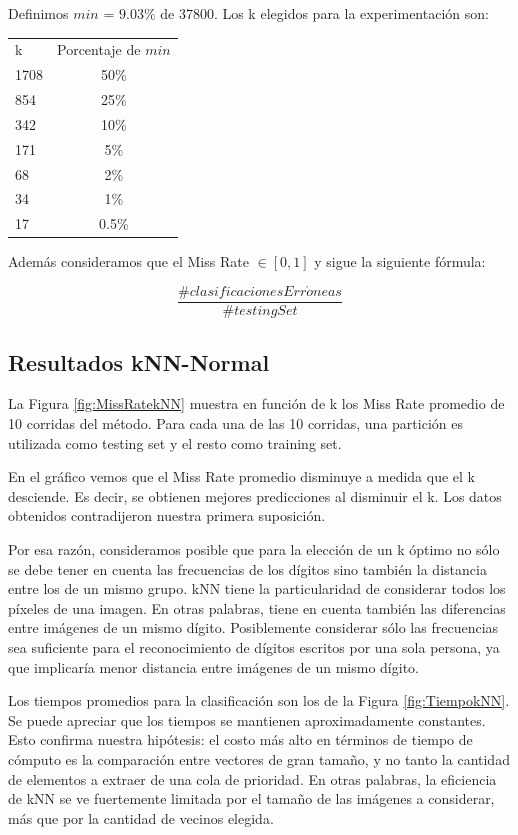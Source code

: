 \documentclass{article}
\begin{document}
Definimos $min$ = $9.03\%$ de 37800. Los k elegidos para la experimentación son: \newline

\begin{center}
\begin{tabular}{ l | c }
 k & Porcentaje de $min$  \\
1708 & 50\% \\
854 & 25\% \\
342 & 10\% \\
171 & 5\% \\
68 & 2\% \\
34 & 1\% \\
17& 0.5\% \\

\end{tabular}
\end{center}

Además consideramos que el Miss Rate $\in [0,1]$ y sigue la siguiente fórmula:

$$\frac{\#clasificacionesErr\acute{o}neas}{\#testingSet}$$

\subsection*{Resultados kNN-Normal}

La Figura \ref{fig:MissRatekNN} muestra en función de k los Miss Rate promedio de 10 corridas del método. Para cada una de las 10 corridas, una partición es utilizada como testing set y el resto como training set.

En el gráfico vemos que el Miss Rate promedio disminuye a medida que el k desciende. Es decir, se obtienen mejores predicciones al disminuir el k. Los datos obtenidos contradijeron nuestra primera suposición.

Por esa razón, consideramos posible que para la elección de un k óptimo no sólo se debe tener en cuenta las frecuencias de los dígitos sino también la distancia entre los de un mismo grupo. kNN tiene la particularidad de considerar todos los píxeles de una imagen. En otras palabras, tiene en cuenta también las diferencias entre imágenes de un mismo dígito. Posiblemente considerar sólo las frecuencias sea suficiente para el reconocimiento de dígitos escritos por una sola persona, ya que implicaría menor distancia entre imágenes de un mismo dígito.

Los tiempos promedios para la clasificación son los de la Figura \ref{fig:TiempokNN}. Se puede apreciar que los tiempos se mantienen aproximadamente constantes. Esto confirma nuestra hipótesis: el costo más alto en términos de tiempo de cómputo es la comparación entre vectores de gran tamaño, y no tanto la cantidad de elementos a extraer de una cola de prioridad. En otras palabras, la eficiencia de kNN se ve fuertemente limitada por el tamaño de las imágenes a considerar, más que por la cantidad de vecinos elegida.
\end{document}
